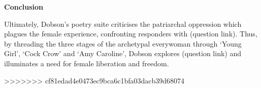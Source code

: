 	\textbf{Conclusion}

	Ultimately, Dobson's poetry suite criticises the patriarchal oppression which plagues the female experience, confronting responders with (question link). Thus, by threading the three stages of the archetypal everywoman through ‘Young Girl’, ‘Cock Crow’ and ‘Amy Caroline’, Dobson explores (question link) and illuminates a need for female liberation and freedom.


>>>>>>> cf81edad4e0473ec9bca6c1bfa03dacb39d68074
